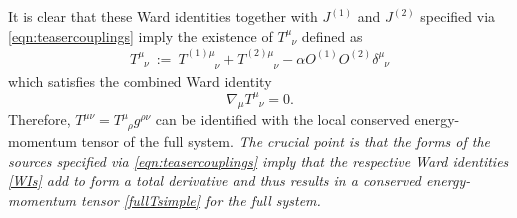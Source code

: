 \documentclass[prd,reprint,a4paper,showpacs,superscriptaddress,11pt,onecolumn,nofootinbib]{revtex4-1}
\renewcommand{\(}{\left(}
\renewcommand{\)}{\right)}
\newcommand{\6}{\partial}
\begin{document}
It is clear that these Ward identities together with $J^{(1)}$ and $J^{(2)}$ specified via \eqref{eqn:teasercouplings} imply the existence of $T^{\mu}_{\phantom{\mu}\nu}$ defined as
\begin{equation}\label{fullTsimple}
T^\mu_{\phantom{\mu}\nu} ~ := ~ T^{(1)\mu}_{\phantom{(1)\mu}\nu} + T^{(2)\mu}_{\phantom{(2)\mu}\nu} - \alpha O^{(1)}O^{(2)} \delta^\mu_{\phantom{\mu}\nu} 
\end{equation}
which satisfies the combined Ward identity
\begin{equation}\label{eqn:teaserwardidentity}
\nabla_\mu T^{\mu}_{\phantom{\mu}\nu} = 0.
\end{equation}
Therefore, $  T^{\mu\nu} =T^{\mu}_{\phantom{\mu}\rho}g^{\rho\nu}$ can be identified with the local conserved energy-momentum tensor of the full system. \textit{The crucial point is that the forms of the sources specified via \eqref{eqn:teasercouplings} imply that the respective Ward identities \eqref{WIs} add to form a total derivative and thus results in a conserved energy-momentum tensor \eqref{fullTsimple} for the full system.}
\end{document}
